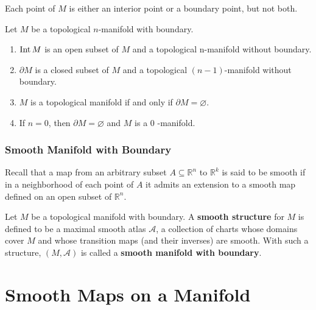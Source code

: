 \documentclass[12pt, oneside]{book}
\begin{document}
\begin{theorem}
    Each point of $M$ is either an interior point or a boundary point, but not both.
\end{theorem}

\begin{corollary}
    Let $M$ be a topological $n$-manifold with boundary.
    \begin{enumerate}
        \item
              $\operatorname{\operatorname{Int}} M$ is an open subset of $M$ and a topological n-manifold without boundary.

        \item
              $\partial M$ is a closed subset of $M$ and a topological $(n-1)$-manifold without boundary.

        \item
              $M$ is a topological manifold if and only if $\partial M=\varnothing$.

        \item
              If $n=0$, then $\partial M=\varnothing$ and $M$ is a $0$ -manifold.
    \end{enumerate}
\end{corollary}






\subsubsection{Smooth Manifold with Boundary}
Recall that a map from an arbitrary subset $A \subseteq \mathbb{R}^n$ to $\mathbb{R}^k$ is said to be smooth if in a neighborhood of each point of $A$ it admits an extension to a smooth map defined on an open subset of $\mathbb{R}^n$.
\begin{definition}
    Let $M$ be a topological manifold with boundary. A \textbf{smooth structure} for $M$ is defined to be a maximal smooth atlas $\mathcal{A}$, a collection of charts whose domains cover $M$ and whose transition maps (and their inverses) are smooth.
    With such a structure, $\left(M,\mathcal{A}\right)$ is called a \textbf{smooth manifold with boundary}.
\end{definition}



\section{Smooth Maps on a Manifold}
\end{document}
